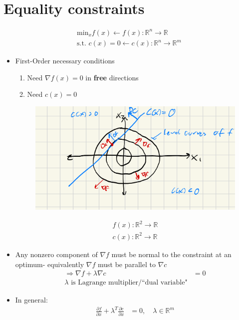 \documentclass[11pt]{article}
\begin{document}
\section{Equality constraints}
\begin{align*}
    \text{min}_x f(x) \leftarrow f(x) : \mathbb{R}^n\rightarrow \mathbb{R}
    \\
    \text{s.t. } c(x) = 0 \leftarrow c(x) : \mathbb{R}^n\rightarrow \mathbb{R}^m
\end{align*}
\begin{itemize}
    \item First-Order necessary conditions
    \begin{enumerate}
        \item Need $\nabla f(x) = 0$ in \textbf{free} directions
        \item Need $c(x) = 0$
    \end{enumerate}
    \begin{figure}[H]
        \centering
        \includegraphics[width=0.7\linewidth]{lecture_4_1.png}
    \end{figure}
    \begin{align*}
        f(x) : \mathbb{R}^2 \rightarrow \mathbb{R}
        \\
        c(x) : \mathbb{R}^2 \rightarrow \mathbb{R}
    \end{align*}
    \item Any nonzero component of $\nabla f$ must be normal to the constraint at an optimum- equivalently $\nabla f$ must be parallel to $\nabla c$
    \begin{align*}
        \Rightarrow \nabla f + \lambda \nabla c &= 0 
        \\
        \lambda \text{ is Lagrange multiplier/``dual variable"}
    \end{align*}
    \item In general:
    \begin{align*}
        \frac{\partial f}{\partial x} + \lambda^T \frac{\partial c}{\partial x} &= 0, \quad \lambda\in \mathbb{R}^m

\end{align*}
\end{itemize}
\end{document}

